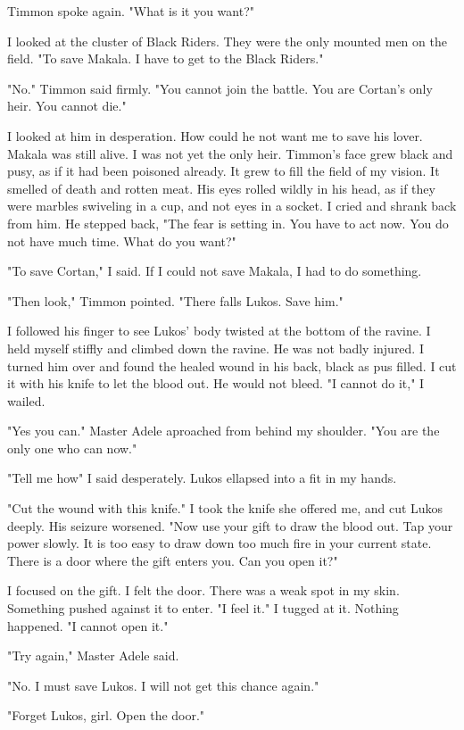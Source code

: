 \documentclass{article}
\begin{document}
Timmon spoke again. "What is it you want?"

I looked at the cluster of Black Riders. They were the only mounted men on the field. "To save Makala. I have to get to the Black Riders."

"No." Timmon said firmly. "You cannot join the battle. You are Cortan's only heir. You cannot die."

I looked at him in desperation. How could he not want me to save his lover. Makala was still alive. I was not yet the only heir. Timmon's face grew black and pusy, as if it had been poisoned already. It grew to fill the field of my vision. It smelled of death and rotten meat. His eyes rolled wildly in his head, as if they were marbles swiveling in a cup, and not eyes in a socket. I cried and shrank back from him. He stepped back, "The fear is setting in. You have to act now. You do not have much time. What do you want?"

"To save Cortan," I said. If I could not save Makala, I had to do something.

"Then look," Timmon pointed. "There falls Lukos. Save him."

I followed his finger to see Lukos' body twisted at the bottom of the ravine. I held myself stiffly and climbed down the ravine. He was not badly injured. I turned him over and found the healed wound in his back, black as pus filled. I cut it with his knife to let the blood out. He would not bleed. "I cannot do it," I wailed. 

"Yes you can." Master Adele aproached from behind my shoulder. "You are the only one who can now." 

"Tell me how" I said desperately. Lukos ellapsed into a fit in my hands. 

"Cut the wound with this knife." I took the knife she offered me, and cut Lukos deeply. His seizure worsened. "Now use your gift to draw the blood out. Tap your power slowly. It is too easy to draw down too much fire in your current state. There is a door where the gift enters you. Can you open it?"

I focused on the gift. I felt the door. There was a weak spot in my skin. Something pushed against it to enter. "I feel it." I tugged at it. Nothing happened. "I cannot open it." 

"Try again," Master Adele said.

"No. I must save Lukos. I will not get this chance again."

"Forget Lukos, girl. Open the door."
\end{document}
